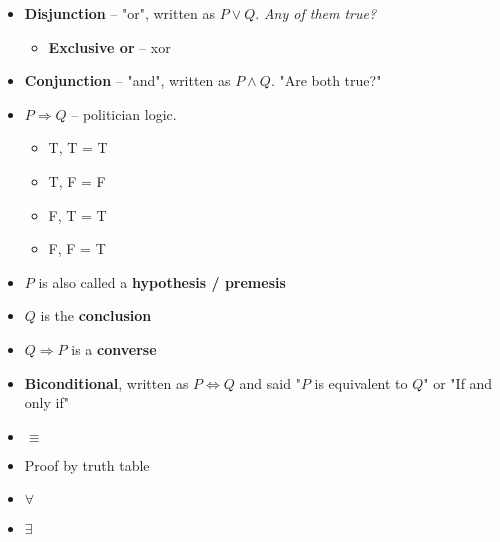 \documentclass[english,10pt,a4paper]{article}
\begin{document}
\begin{theo} 
\begin{itemize}
\item \textbf{Disjunction} -- "or", written as $P \vee Q$. \textit{Any of them true?}
\begin{itemize}
\item \textbf{Exclusive or} -- xor
\end{itemize}
\item \textbf{Conjunction} -- "and", written as $P\wedge Q$. "Are both true?"
\end{itemize}
\end{theo}

\begin{theo} 
\begin{itemize}
\item $P \Rightarrow Q$ -- politician logic.
\begin{itemize}
\item T, T = T
\item T, F = F
\item F, T = T
\item F, F = T
\end{itemize}
\item $P$ is also called a \textbf{hypothesis / premesis}
\item $Q$ is the \textbf{conclusion}
\item $Q \Rightarrow P$ is a \textbf{converse}
\item \textbf{Biconditional}, written as $P \Leftrightarrow Q$ and said "$P$ is equivalent to $Q$" or "If and only if"
\end{itemize}
\end{theo}

\begin{theo} 
\begin{itemize}
\item $\equiv$
\end{itemize}
\end{theo}

\begin{theo} 
\begin{itemize}
\item Proof by truth table
\end{itemize}
\end{theo}

\begin{theo}[Quantifiers] 
\begin{itemize}
\item $\forall$
\item $\exists$
\end{itemize}
\end{theo}
\end{document}
